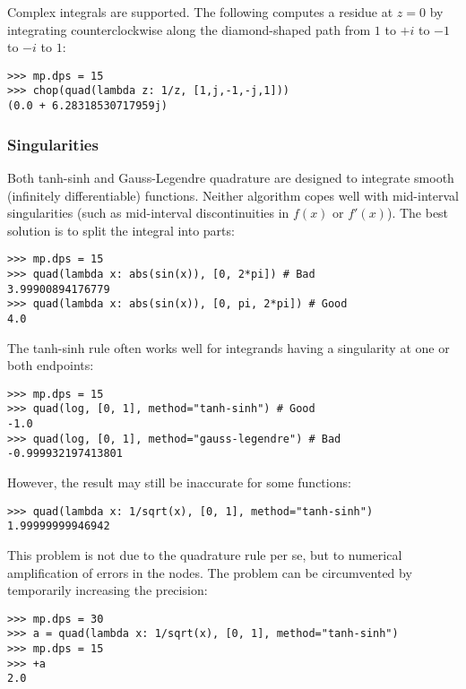 Complex integrals are supported. The following computes a residue at $z=0$ by integrating counterclockwise along the diamond-shaped path from $1$ to $+i$ to $-1$ to $-i$ to $1$:

\begin{lstlisting}
>>> mp.dps = 15
>>> chop(quad(lambda z: 1/z, [1,j,-1,-j,1]))
(0.0 + 6.28318530717959j)
\end{lstlisting}



\subsubsection{Singularities}

Both tanh-sinh and Gauss-Legendre quadrature are designed to integrate smooth (infinitely differentiable) functions. Neither algorithm copes well with mid-interval singularities (such as mid-interval discontinuities in $f(x)$ or $f'(x)$). The best solution is to split the integral into parts:

\begin{lstlisting}
>>> mp.dps = 15
>>> quad(lambda x: abs(sin(x)), [0, 2*pi]) # Bad
3.99900894176779
>>> quad(lambda x: abs(sin(x)), [0, pi, 2*pi]) # Good
4.0
\end{lstlisting}

The tanh-sinh rule often works well for integrands having a singularity at one or both endpoints:

\begin{lstlisting}
>>> mp.dps = 15
>>> quad(log, [0, 1], method="tanh-sinh") # Good
-1.0
>>> quad(log, [0, 1], method="gauss-legendre") # Bad
-0.999932197413801
\end{lstlisting}

However, the result may still be inaccurate for some functions:

\begin{lstlisting}
>>> quad(lambda x: 1/sqrt(x), [0, 1], method="tanh-sinh")
1.99999999946942
\end{lstlisting}

This problem is not due to the quadrature rule per se, but to numerical amplification of errors in the nodes. The problem can be circumvented by temporarily increasing the precision:

\begin{lstlisting}
>>> mp.dps = 30
>>> a = quad(lambda x: 1/sqrt(x), [0, 1], method="tanh-sinh")
>>> mp.dps = 15
>>> +a
2.0
\end{lstlisting}




